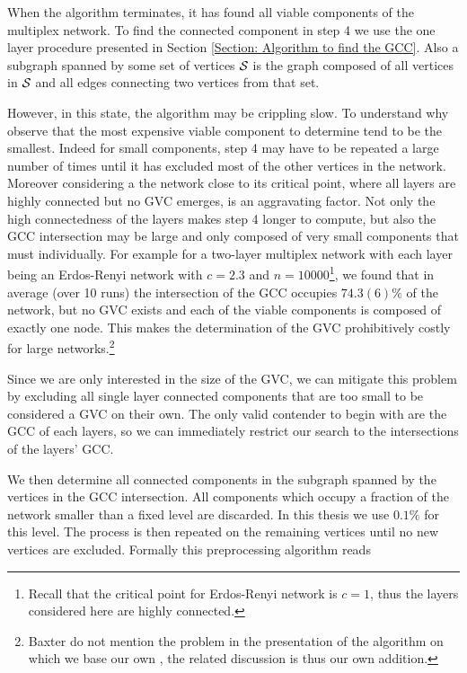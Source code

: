 \documentclass[
11pt, %
american, %
singlespacing, %
final, %
nolistspacing, %
liststotoc, %
headsepline, %
]{MastersDoctoralThesis} %
\begin{document}
When the algorithm terminates, it has found all viable components of the multiplex network. To find the connected component in step 4 we use the one layer procedure presented in Section \ref{Section: Algorithm to find the GCC}. Also a subgraph spanned by some set of vertices $\mathcal{S}_{\text{\tiny }}$ is the graph composed of all vertices in $\mathcal{S}_{\text{\tiny }}$ and all edges connecting two vertices from that set.

However, in this state, the algorithm may be crippling slow. To understand why observe that the most expensive viable component to determine tend to be the smallest. Indeed for small components, step 4 may have to be repeated a large number of times until it has excluded most of the other vertices in the network. Moreover considering a the network close to its critical point, where all layers are highly connected but no GVC emerges, is an aggravating factor. Not only the high connectedness of the layers makes step 4 longer to compute, but also the GCC intersection may be large and only composed of very small components that must individually. For example for a two-layer multiplex network with each layer being an Erdos-Renyi network with $c = 2.3$ and $n = 10000$\footnote{Recall that the critical point for Erdos-Renyi network is $c = 1$, thus the layers considered here are highly connected.}, we found that in average (over 10 runs) the intersection of the GCC occupies $74.3(6) \%$ of the network, but  no GVC exists and each of the viable components is composed of exactly one node. This makes the determination of the GVC prohibitively costly for large networks.\footnote{Baxter \etal{} do not mention the problem in the presentation of the algorithm on which we base our own \cite{baxter2012avalanche}, the related discussion is thus our own addition.}

Since we are only interested in the size of the GVC, we can mitigate this problem by excluding all single layer connected components that are too small to be considered a GVC on their own. The only valid contender to begin with are the GCC of each layers, so we can immediately restrict our search to the intersections of the layers' GCC.

We then determine all connected components in the subgraph spanned by the vertices in the GCC intersection. All components which occupy a fraction of the network smaller than a fixed level are discarded. In this thesis we use $0.1\%$ for this level. The process is then repeated on the remaining vertices until no new vertices are excluded. Formally this preprocessing algorithm reads
\end{document}
